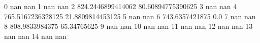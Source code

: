 0 nan nan
1 nan nan
2 824.2446899414062 80.60894775390625
3 nan nan
4 765.5167236328125 21.8809814453125
5 nan nan
6 743.6357421875 0.0
7 nan nan
8 808.9833984375 65.34765625
9 nan nan
10 nan nan
11 nan nan
12 nan nan
13 nan nan
14 nan nan

